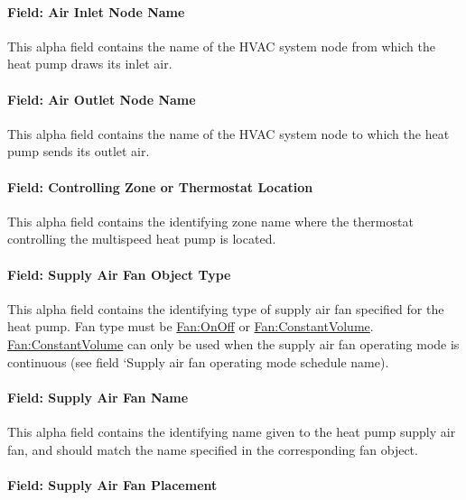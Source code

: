 \paragraph{Field: Air Inlet Node Name}\label{field-air-inlet-node-name-1-005}

This alpha field contains the name of the HVAC system node from which the heat pump draws its inlet air.

\paragraph{Field: Air Outlet Node Name}\label{field-air-outlet-node-name-1-004}

This alpha field contains the name of the HVAC system node to which the heat pump sends its outlet air.

\paragraph{Field: Controlling Zone or Thermostat Location}\label{field-controlling-zone-or-thermostat-location-4}

This alpha field contains the identifying zone name where the thermostat controlling the multispeed heat pump is located.

\paragraph{Field: Supply Air Fan Object Type}\label{field-supply-air-fan-object-type-1}

This alpha field contains the identifying type of supply air fan specified for the heat pump. Fan type must be \hyperref[fanonoff]{Fan:OnOff} or \hyperref[fanconstantvolume]{Fan:ConstantVolume}. \hyperref[fanconstantvolume]{Fan:ConstantVolume} can only be used when the supply air fan operating mode is continuous (see field `Supply air fan operating mode schedule name).

\paragraph{Field: Supply Air Fan Name}\label{field-supply-air-fan-name-1}

This alpha field contains the identifying name given to the heat pump supply air fan, and should match the name specified in the corresponding fan object.

\paragraph{Field: Supply Air Fan Placement}\label{field-supply-air-fan-placement}

